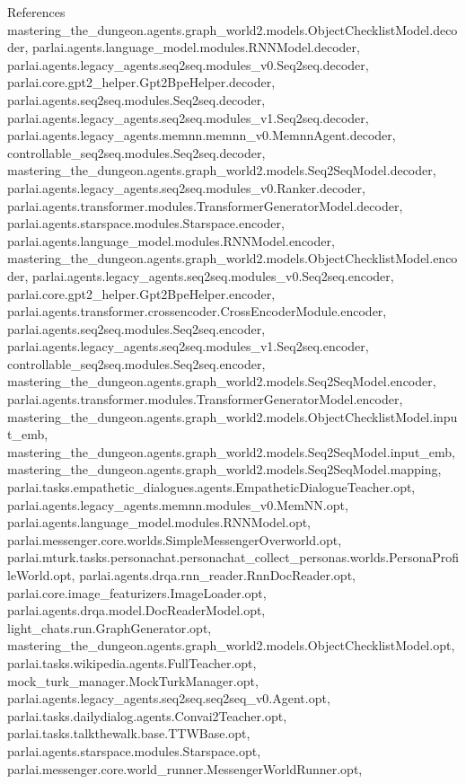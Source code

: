 References mastering\+\_\+the\+\_\+dungeon.\+agents.\+graph\+\_\+world2.\+models.\+Object\+Checklist\+Model.\+decoder, parlai.\+agents.\+language\+\_\+model.\+modules.\+R\+N\+N\+Model.\+decoder, parlai.\+agents.\+legacy\+\_\+agents.\+seq2seq.\+modules\+\_\+v0.\+Seq2seq.\+decoder, parlai.\+core.\+gpt2\+\_\+helper.\+Gpt2\+Bpe\+Helper.\+decoder, parlai.\+agents.\+seq2seq.\+modules.\+Seq2seq.\+decoder, parlai.\+agents.\+legacy\+\_\+agents.\+seq2seq.\+modules\+\_\+v1.\+Seq2seq.\+decoder, parlai.\+agents.\+legacy\+\_\+agents.\+memnn.\+memnn\+\_\+v0.\+Memnn\+Agent.\+decoder, controllable\+\_\+seq2seq.\+modules.\+Seq2seq.\+decoder, mastering\+\_\+the\+\_\+dungeon.\+agents.\+graph\+\_\+world2.\+models.\+Seq2\+Seq\+Model.\+decoder, parlai.\+agents.\+legacy\+\_\+agents.\+seq2seq.\+modules\+\_\+v0.\+Ranker.\+decoder, parlai.\+agents.\+transformer.\+modules.\+Transformer\+Generator\+Model.\+decoder, parlai.\+agents.\+starspace.\+modules.\+Starspace.\+encoder, parlai.\+agents.\+language\+\_\+model.\+modules.\+R\+N\+N\+Model.\+encoder, mastering\+\_\+the\+\_\+dungeon.\+agents.\+graph\+\_\+world2.\+models.\+Object\+Checklist\+Model.\+encoder, parlai.\+agents.\+legacy\+\_\+agents.\+seq2seq.\+modules\+\_\+v0.\+Seq2seq.\+encoder, parlai.\+core.\+gpt2\+\_\+helper.\+Gpt2\+Bpe\+Helper.\+encoder, parlai.\+agents.\+transformer.\+crossencoder.\+Cross\+Encoder\+Module.\+encoder, parlai.\+agents.\+seq2seq.\+modules.\+Seq2seq.\+encoder, parlai.\+agents.\+legacy\+\_\+agents.\+seq2seq.\+modules\+\_\+v1.\+Seq2seq.\+encoder, controllable\+\_\+seq2seq.\+modules.\+Seq2seq.\+encoder, mastering\+\_\+the\+\_\+dungeon.\+agents.\+graph\+\_\+world2.\+models.\+Seq2\+Seq\+Model.\+encoder, parlai.\+agents.\+transformer.\+modules.\+Transformer\+Generator\+Model.\+encoder, mastering\+\_\+the\+\_\+dungeon.\+agents.\+graph\+\_\+world2.\+models.\+Object\+Checklist\+Model.\+input\+\_\+emb, mastering\+\_\+the\+\_\+dungeon.\+agents.\+graph\+\_\+world2.\+models.\+Seq2\+Seq\+Model.\+input\+\_\+emb, mastering\+\_\+the\+\_\+dungeon.\+agents.\+graph\+\_\+world2.\+models.\+Seq2\+Seq\+Model.\+mapping, parlai.\+tasks.\+empathetic\+\_\+dialogues.\+agents.\+Empathetic\+Dialogue\+Teacher.\+opt, parlai.\+agents.\+legacy\+\_\+agents.\+memnn.\+modules\+\_\+v0.\+Mem\+N\+N.\+opt, parlai.\+agents.\+language\+\_\+model.\+modules.\+R\+N\+N\+Model.\+opt, parlai.\+messenger.\+core.\+worlds.\+Simple\+Messenger\+Overworld.\+opt, parlai.\+mturk.\+tasks.\+personachat.\+personachat\+\_\+collect\+\_\+personas.\+worlds.\+Persona\+Profile\+World.\+opt, parlai.\+agents.\+drqa.\+rnn\+\_\+reader.\+Rnn\+Doc\+Reader.\+opt, parlai.\+core.\+image\+\_\+featurizers.\+Image\+Loader.\+opt, parlai.\+agents.\+drqa.\+model.\+Doc\+Reader\+Model.\+opt, light\+\_\+chats.\+run.\+Graph\+Generator.\+opt, mastering\+\_\+the\+\_\+dungeon.\+agents.\+graph\+\_\+world2.\+models.\+Object\+Checklist\+Model.\+opt, parlai.\+tasks.\+wikipedia.\+agents.\+Full\+Teacher.\+opt, mock\+\_\+turk\+\_\+manager.\+Mock\+Turk\+Manager.\+opt, parlai.\+agents.\+legacy\+\_\+agents.\+seq2seq.\+seq2seq\+\_\+v0.\+Agent.\+opt, parlai.\+tasks.\+dailydialog.\+agents.\+Convai2\+Teacher.\+opt, parlai.\+tasks.\+talkthewalk.\+base.\+T\+T\+W\+Base.\+opt, parlai.\+agents.\+starspace.\+modules.\+Starspace.\+opt, parlai.\+messenger.\+core.\+world\+\_\+runner.\+Messenger\+World\+Runner.\+opt, 